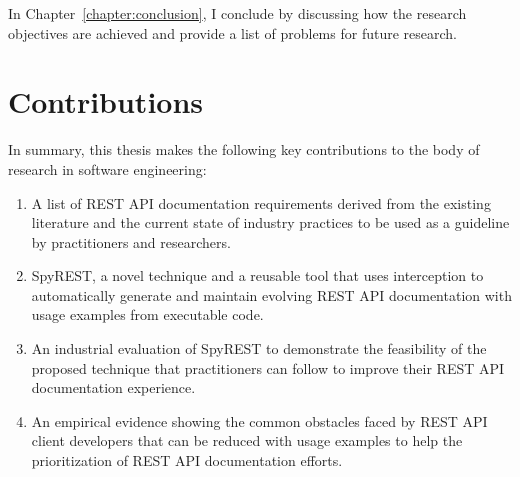 In Chapter~\ref{chapter:conclusion}, I conclude by discussing how the research objectives are achieved and provide a list of problems for future research.

\section{Contributions}
In summary, this thesis makes the following key contributions to the body of research in software engineering:


\begin{enumerate}
  \item A list of REST API documentation requirements derived from the existing literature and the current state of industry practices to be used as a guideline by practitioners and researchers.
  \item SpyREST, a novel technique and a reusable tool that uses interception to automatically generate and maintain evolving REST API documentation with usage examples from executable code.
  \item An industrial evaluation of SpyREST to demonstrate the feasibility of the proposed technique that practitioners can follow to improve their REST API documentation experience.
  \item An empirical evidence showing the common obstacles faced by REST API client developers that can be reduced with usage examples to help the prioritization of REST API documentation efforts.
\end{enumerate}





